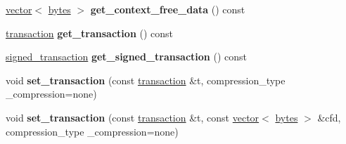 \begin{DoxyCompactItemize}
\mbox{\hyperlink{classstd_1_1vector}{vector}}$<$ \mbox{\hyperlink{classstd_1_1vector}{bytes}} $>$ {\bfseries get\+\_\+context\+\_\+free\+\_\+data} () const
\item 
\mbox{\label{structaacio_1_1chain_1_1packed__transaction_aa65f2afd4d4c0c8c22a2ac911ab6342a}} 
\mbox{\hyperlink{structaacio_1_1chain_1_1transaction}{transaction}} {\bfseries get\+\_\+transaction} () const
\item 
\mbox{\label{structaacio_1_1chain_1_1packed__transaction_aa415906bf30c203f5000c59de4a5c759}} 
\mbox{\hyperlink{structaacio_1_1chain_1_1signed__transaction}{signed\+\_\+transaction}} {\bfseries get\+\_\+signed\+\_\+transaction} () const
\item 
\mbox{\label{structaacio_1_1chain_1_1packed__transaction_a2c6e6908db266797a1f7a1cf92031aab}} 
void {\bfseries set\+\_\+transaction} (const \mbox{\hyperlink{structaacio_1_1chain_1_1transaction}{transaction}} \&t, compression\+\_\+type \+\_\+compression=none)
\item 
\mbox{\label{structaacio_1_1chain_1_1packed__transaction_a7e257f84624d6d700a3501d938b7bed6}} 
void {\bfseries set\+\_\+transaction} (const \mbox{\hyperlink{structaacio_1_1chain_1_1transaction}{transaction}} \&t, const \mbox{\hyperlink{classstd_1_1vector}{vector}}$<$ \mbox{\hyperlink{classstd_1_1vector}{bytes}} $>$ \&cfd, compression\+\_\+type \+\_\+compression=none)
\end{DoxyCompactItemize}
